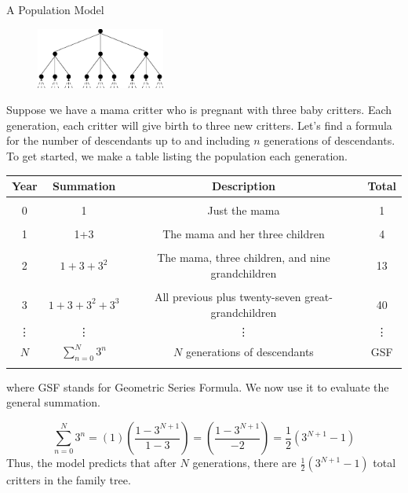 \begin{example}{A Population Model}\label{Critteria}
\begin{figure}
    	\centering
		\includegraphics[height=75px]{ChapterSeqSer/Figures/PopulationModel}
	\end{figure}

Suppose we have a mama critter who is pregnant with three baby critters.  Each generation, each critter will give birth to three  new critters.  Let's find a formula for the number of descendants up to and including $n$ generations of descendants.  To get started, we make a table listing the population each generation.

\begin{center}
\begin{tabular}{|c|c|c|c|} \hline
Year & Summation & Description & Total \\ \hline & & & \\
0 & 1 & Just the mama & 1 \\ & & & \\
1 & 1+3 & The mama and her three children & 4 \\ & & & \\
2 & $1+3+3^2$ & The mama, three children, and nine grandchildren & 13  \\  & & & \\ 
3 & $1+3+3^2+3^3$ & All previous plus twenty-seven great-grandchildren & 40  \\  
\vdots & \vdots & \vdots & \vdots \\
$N$ & $\sum_{n=0}^N 3^n$ & $N$ generations of descendants & GSF \\ & & & \\
\hline
\end{tabular}
\end{center}
where GSF stands for Geometric Series Formula.  We now use it to evaluate the general summation.

$$\sum_{n=0}^N 3^n=\left(1\right)\left(\frac{1-3^{N+1}}{1-3}\right)=\left(\frac{1-3^{N+1}}{-2}\right)=\frac{1}{2}\left(3^{N+1}-1\right)$$
Thus, the model predicts that after $N$ generations, there are $\frac{1}{2}\left(3^{N+1}-1\right)$ total critters in the family tree.
\end{example}

